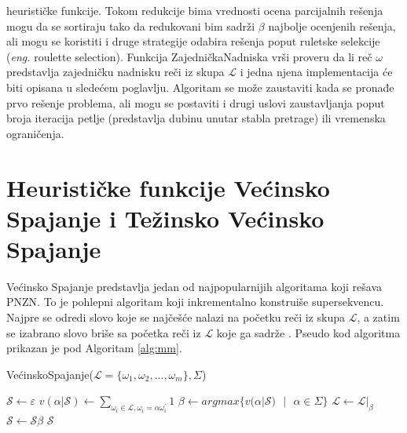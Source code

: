 \documentclass[12pt,oneside]{memoir}
\begin{document}
heurističke funkcije. Tokom redukcije bima vrednosti ocena parcijalnih rešenja mogu da se sortiraju tako da redukovani
bim sadrži $\beta$ najbolje ocenjenih rešenja, ali mogu se koristiti i druge strategije odabira rešenja poput ruletske
selekcije (\textit{eng.} roulette selection). Funkcija ZajedničkaNadniska vrši proveru da li reč $\omega$
predstavlja zajedničku nadnisku reči iz skupa $\mathcal{L}$ i jedna njena implementacija će biti opisana u sledećem poglavlju.
Algoritam se može zaustaviti kada se pronađe prvo rešenje problema, ali mogu se postaviti i drugi uslovi zaustavljanja
poput broja iteracija petlje (predstavlja dubinu unutar stabla pretrage) ili vremenska ograničenja.

\section{Heurističke funkcije Većinsko Spajanje i Težinsko Većinsko Spajanje}
Većinsko Spajanje predstavlja jedan od najpopularnijih algoritama koji rešava PNZN. To je pohlepni algoritam
koji inkrementalno konstruiše supersekvencu. Najpre se odredi slovo koje se najčešće nalazi na početku reči
iz skupa $\mathcal{L}$, a zatim se izabrano slovo briše sa početka reči iz $\mathcal{L}$ koje ga sadrže \cite{ProbabilisticBS}.
Pseudo kod algoritma prikazan je pod Algoritam \ref{alg:mm}.

\begin{algorithm}
  \caption{VećinskoSpajanje($\mathcal{L}=\{\omega_{1}, \omega_{2},..., \omega_{m}\}, \Sigma$)}
  \label{alg:mm}
  \begin{algorithmic}[1]
  \State $\mathcal{S} \gets \varepsilon$ 
  \For{$\alpha \in \Sigma$}
        \State $v(\alpha|\mathcal{S}) \gets \sum_{\omega_{i}\in\mathcal{L},\omega_{i}=\alpha\omega^{'}_{i}}1$
  \EndFor
  \State $\beta \gets argmax \{v(\alpha|\mathcal{S})\textrm{ }|\textrm{ }\alpha \in \Sigma \}$
  \State $\mathcal{L} \gets \mathcal{L}|_{\beta}$
  \State $\mathcal{S} \gets \mathcal{S}\beta$
  \EndWhile
  \State \Return $\mathcal{S}$
  \end{algorithmic}
  \end{algorithm}
\end{document}

